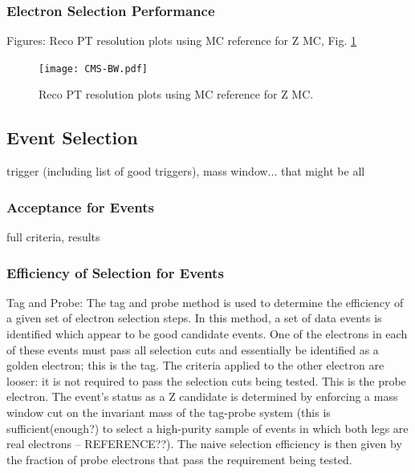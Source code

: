 \subsubsection{Electron Selection Performance} %
Figures: Reco PT resolution plots using MC reference for Z MC, Fig. \ref{fig:RecoPtResolution}

 \begin{figure}[htb]
  \begin{center}
    \texttt{[image: CMS-BW.pdf]}
  \end{center}
  \caption[Reco PT resolution plots using MC reference for Z MC]{Reco PT resolution plots using MC reference for Z MC.}
  \label{fig:RecoPtResolution}
 \end{figure}


\subsection{\Zee Event Selection}
trigger (including list of good triggers), mass window... that might be all

\subsubsection{Acceptance for \Zee Events}
full criteria, results

\subsubsection{Efficiency of Selection for \Zee Events}
Tag and Probe:  The tag and probe method is used to determine the efficiency of a given set of electron selection steps.  
In this method, a set of data events is identified which appear to be good 
\Zee
candidate events.  
One of the electrons in each of these events must pass 
all selection cuts and essentially be identified as a golden electron; 
this is the tag.  
The criteria applied to the other electron are looser: it is not required to pass the selection cuts being tested.  
This is the probe electron.  
The event's status as a Z candidate is determined by enforcing a mass window cut on the invariant mass of the tag-probe system 
(this is sufficient(enough?) to select a high-purity sample of events in which both legs are real electrons -- REFERENCE??).  
The naive selection efficiency is then given by the fraction of probe electrons that pass the requirement being tested.  

